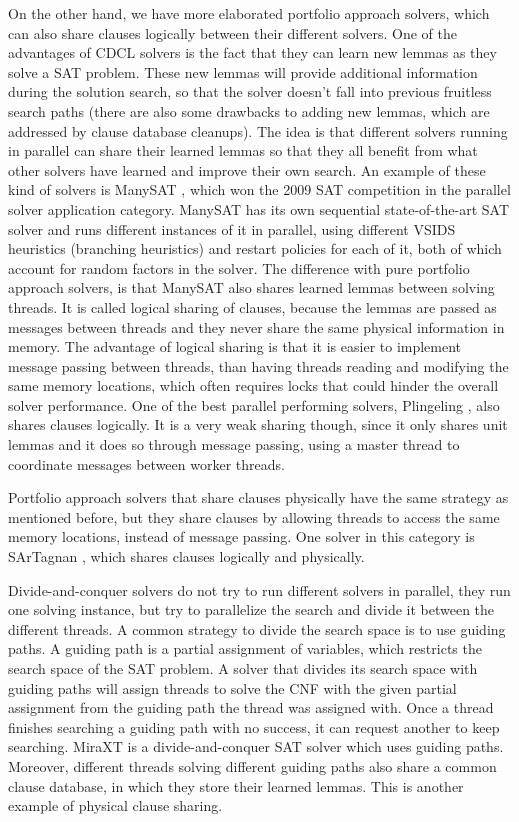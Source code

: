 \documentclass[12pt]{diicc}
\begin{document}
On the other hand, we have more elaborated portfolio approach solvers, which can also share clauses logically between their different solvers. One of the advantages of CDCL solvers is the fact that they can learn new lemmas as they solve a SAT problem. These new lemmas will provide additional information during the solution search, so that the solver doesn't fall into previous fruitless search paths (there are also some drawbacks to adding new lemmas, which are addressed by clause database cleanups). The idea is that different solvers running in parallel can share their learned lemmas so that they all benefit from what other solvers have learned and improve their own search. An example of these kind of solvers is ManySAT \cite{manysat}, which won the 2009 SAT competition in the parallel solver application category. ManySAT has its own sequential state-of-the-art SAT solver and runs different instances of it in parallel, using different VSIDS \cite{vsids} heuristics (branching heuristics) and restart policies for each of it, both of which account for random factors in the solver. The difference with pure portfolio approach solvers, is that ManySAT also shares learned lemmas between solving threads. It is called logical sharing of clauses, because the lemmas are passed as messages between threads and they never share the same physical information in memory. The advantage of logical sharing is that it is easier to implement message passing between threads, than having threads reading and modifying the same memory locations, which often requires locks that could hinder the overall solver performance. One of the best parallel performing solvers, Plingeling \cite{plingeling}, also shares clauses logically. It is a very weak sharing though, since it only shares unit lemmas and it does so through message passing, using a master thread to coordinate messages between worker threads. 

Portfolio approach solvers that share clauses physically have the same strategy as mentioned before, but they share clauses by allowing threads to access the same memory locations, instead of message passing. One solver in this category is SArTagnan \cite{sartagnan}, which shares clauses logically and physically. 

Divide-and-conquer solvers do not try to run different solvers in parallel, they run one solving instance, but try to parallelize the search and divide it between the different threads. A common strategy to divide the search space is to use guiding paths. A guiding path is a partial assignment of variables, which restricts the search space of the SAT problem. A solver that divides its search space with guiding paths will assign threads to solve the CNF with the given partial assignment from the guiding path the thread was assigned with. Once a thread finishes searching a guiding path with no success, it can request another to keep searching. MiraXT \cite{miraxt} is a divide-and-conquer SAT solver which uses guiding paths. Moreover, different threads solving different guiding paths also share a common clause database, in which they store their learned lemmas. This is another example of physical clause sharing. 
\end{document}
